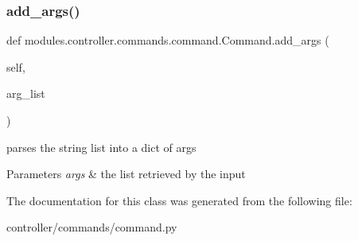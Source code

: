 \subsubsection{\texorpdfstring{add\+\_\+args()}{add\_args()}}
{\footnotesize\ttfamily def modules.\+controller.\+commands.\+command.\+Command.\+add\+\_\+args (\begin{DoxyParamCaption}\item[{}]{self,  }\item[{}]{arg\+\_\+list }\end{DoxyParamCaption})}



parses the string list into a dict of args 


\begin{DoxyParams}{Parameters}
{\em args} & the list retrieved by the input \\
\hline
\end{DoxyParams}


The documentation for this class was generated from the following file\+:\begin{DoxyCompactItemize}
\item 
controller/commands/command.\+py\end{DoxyCompactItemize}
